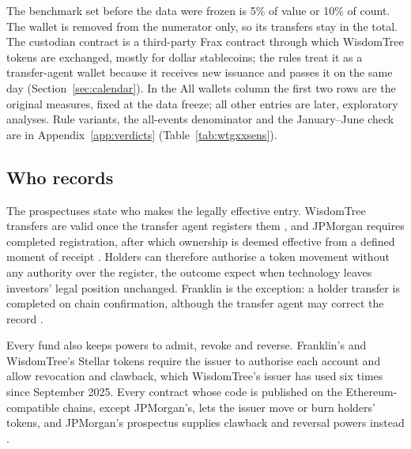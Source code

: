 \documentclass[12pt,a4paper]{article}
\begin{document}
\begin{table}[htbp]
\smallskip
\parbox{\linewidth}{\footnotesize\raggedright The benchmark set before the data were frozen is 5\% of value or 10\% of count. The wallet is removed from the numerator only, so its transfers stay in the total. The custodian contract is a third-party Frax contract through which WisdomTree tokens are exchanged, mostly for dollar stablecoins; the rules treat it as a transfer-agent wallet because it receives new issuance and passes it on the same day (Section~\ref{sec:calendar}). In the All wallets column the first two rows are the original measures, fixed at the data freeze; all other entries are later, exploratory analyses. Rule variants, the all-events denominator and the January--June check are in Appendix~\ref{app:verdicts} (Table~\ref{tab:wtgxxsens}).}
\end{table}

\subsection{Who records}
The prospectuses state who makes the legally effective entry. WisdomTree transfers are valid once the transfer agent registers them \citep[p.~143]{WisdomTreeTMMDF2025}, and JPMorgan requires completed registration, after which ownership is deemed effective from a defined moment of receipt \citep[pp.~27--28]{JPMorganOnChainLTMMF2026}. Holders can therefore authorise a token movement without any authority over the register, the outcome \citet[p.~545]{MichelerZaccaria2024} expect when technology leaves investors' legal position unchanged. Franklin is the exception: a holder transfer is completed on chain confirmation, although the transfer agent may correct the record \citep[p.~38]{FranklinOnChain2026}.

Every fund also keeps powers to admit, revoke and reverse. Franklin's and WisdomTree's Stellar tokens require the issuer to authorise each account and allow revocation and clawback, which WisdomTree's issuer has used six times since September 2025. Every contract whose code is published on the Ethereum-compatible chains, except JPMorgan's, lets the issuer move or burn holders' tokens, and JPMorgan's prospectus supplies clawback and reversal powers instead \citep[pp.~3, 28]{JPMorganOnChainLTMMF2026}.
\end{document}
